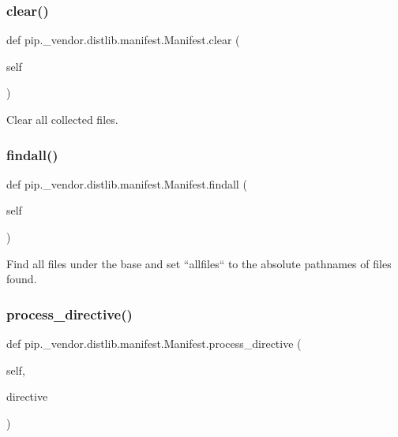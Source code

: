 \subsubsection{\texorpdfstring{clear()}{clear()}}
{\footnotesize\ttfamily def pip.\+\_\+vendor.\+distlib.\+manifest.\+Manifest.\+clear (\begin{DoxyParamCaption}\item[{}]{self }\end{DoxyParamCaption})}

\begin{DoxyVerb}Clear all collected files.\end{DoxyVerb}
 \mbox{\label{classpip_1_1__vendor_1_1distlib_1_1manifest_1_1Manifest_addcd8fc4c92d2b4d110a3c0d50222763}} 
\subsubsection{\texorpdfstring{findall()}{findall()}}
{\footnotesize\ttfamily def pip.\+\_\+vendor.\+distlib.\+manifest.\+Manifest.\+findall (\begin{DoxyParamCaption}\item[{}]{self }\end{DoxyParamCaption})}

\begin{DoxyVerb}Find all files under the base and set ``allfiles`` to the absolute
pathnames of files found.
\end{DoxyVerb}
 \mbox{\label{classpip_1_1__vendor_1_1distlib_1_1manifest_1_1Manifest_a2fa40995f2b5077d7aacd933325eba9f}} 
\subsubsection{\texorpdfstring{process\+\_\+directive()}{process\_directive()}}
{\footnotesize\ttfamily def pip.\+\_\+vendor.\+distlib.\+manifest.\+Manifest.\+process\+\_\+directive (\begin{DoxyParamCaption}\item[{}]{self,  }\item[{}]{directive }\end{DoxyParamCaption})}

